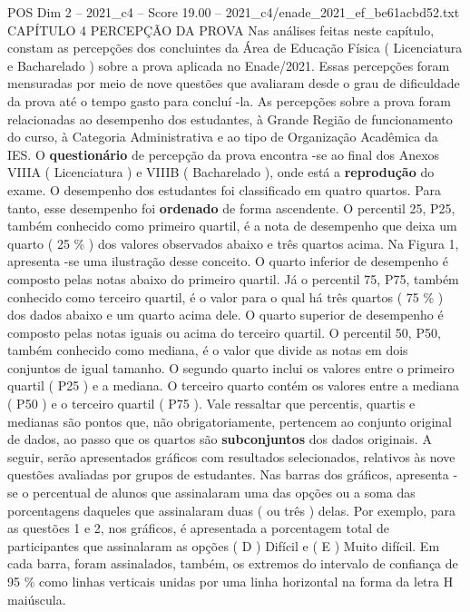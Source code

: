 \begin{textsample}{POS Dim 2 – 2021\_c4 – Score 19.00 – 2021\_c4/enade\_2021\_ef\_be61acbd52.txt}  \label{ex:f2_pos_039}
CAPÍTULO 4 PERCEPÇÃO DA PROVA Nas análises feitas neste capítulo, constam as percepções dos concluintes da Área de Educação Física ( Licenciatura e Bacharelado ) sobre a prova aplicada no Enade/2021.
Essas percepções foram mensuradas por meio de nove questões que avaliaram desde o grau de dificuldade da prova até o tempo gasto para concluí -la.
As percepções sobre a prova foram relacionadas ao desempenho dos estudantes, à Grande Região de funcionamento do curso, à Categoria Administrativa e ao tipo de Organização Acadêmica da IES.
O \textbf{questionário} de percepção da prova encontra -se ao final dos Anexos VIIIA ( Licenciatura ) e VIIIB ( Bacharelado ), onde está a \textbf{reprodução} do exame.
O desempenho dos estudantes foi classificado em quatro quartos.
Para tanto, esse desempenho foi \textbf{ordenado} de forma ascendente.
O percentil 25, P25, também conhecido como primeiro quartil, é a nota de desempenho que deixa um quarto ( 25 \% ) dos valores observados abaixo e três quartos acima.
Na Figura 1, apresenta -se uma ilustração desse conceito.
O quarto inferior de desempenho é composto pelas notas abaixo do primeiro quartil.
Já o percentil 75, P75, também conhecido como terceiro quartil, é o valor para o qual há três quartos ( 75 \% ) dos dados abaixo e um quarto acima dele.
O quarto superior de desempenho é composto pelas notas iguais ou acima do terceiro quartil.
O percentil 50, P50, também conhecido como mediana, é o valor que divide as notas em dois conjuntos de igual tamanho.
O segundo quarto inclui os valores entre o primeiro quartil ( P25 ) e a mediana.
O terceiro quarto contém os valores entre a mediana ( P50 ) e o terceiro quartil ( P75 ).
Vale ressaltar que percentis, quartis e medianas são pontos que, não obrigatoriamente, pertencem ao conjunto original de dados, ao passo que os quartos são \textbf{subconjuntos} dos dados originais.
A seguir, serão apresentados gráficos com resultados selecionados, relativos às nove questões avaliadas por grupos de estudantes.
Nas barras dos gráficos, apresenta -se o percentual de alunos que assinalaram uma das opções ou a soma das porcentagens daqueles que assinalaram duas ( ou três ) delas.
Por exemplo, para as questões 1 e 2, nos gráficos, é apresentada a porcentagem total de participantes que assinalaram as opções ( D ) Difícil e ( E ) Muito difícil.
Em cada barra, foram assinalados, também, os extremos do intervalo de confiança de 95 \% como linhas verticais unidas por uma linha horizontal na forma da letra H maiúscula.

\end{textsample}
